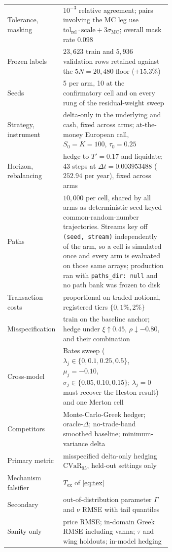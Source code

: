 \documentclass{article}
\begin{document}
\begin{table}[h]
\begin{tabular}{@{}lp{0.66\linewidth}@{}}
Tolerance, masking & $10^{-3}$ relative agreement; pairs involving the MC leg use $\mathrm{tol_{rel}}\cdot\mathrm{scale} + 3\sigma_{\mathrm{MC}}$; overall mask rate $0.098$ \\
Frozen labels & $23{,}623$ train and $5{,}936$ validation rows retained against the $5N = 20{,}480$ floor ($+15.3\%$) \\
Seeds & 5 per arm, 10 at the confirmatory cell and on every rung of the residual-weight sweep \\
\midrule
Strategy, instrument & delta-only in the underlying and cash, fixed across arms; at-the-money European call, $S_0{=}K{=}100$, $\tau_0{=}0.25$ \\
Horizon, rebalancing & hedge to $T'{=}0.17$ and liquidate; 43 steps at $\Delta t=0.003953488$ ($252.94$ per year), fixed across arms \\
Paths & $10{,}000$ per cell, shared by all arms as deterministic seed-keyed common-random-number trajectories. Streams key off \texttt{(seed, stream)} independently of the arm, so a cell is simulated once and every arm is evaluated on those same arrays; production ran with \texttt{paths\_dir: null} and no path bank was frozen to disk \\
Transaction costs & proportional on traded notional, registered tiers $\{0, 1\%, 2\%\}$ \\
Misspecification & train on the baseline anchor; hedge under $\xi{\uparrow}0.45$, $\rho{\downarrow}{-}0.80$, and their combination \\
Cross-model & Bates sweep ($\lambda_j\in\{0,0.1,0.25,0.5\}$, $\mu_j{=}-0.10$, $\sigma_j\in\{0.05,0.10,0.15\}$; $\lambda_j{=}0$ must recover the Heston result) and one Merton cell \\
Competitors & Monte-Carlo-Greek hedger; oracle-$\Delta$; no-trade-band smoothed baseline; minimum-variance delta \\
\midrule
Primary metric & misspecified delta-only hedging $\mathrm{CVaR}_{95}$, held-out settings only \\
Mechanism falsifier & $T_{\mathrm{ex}}$ of \eqref{eq:tex} \\
Secondary & out-of-distribution parameter $\Gamma$ and $\nu$ RMSE with tail quantiles \\
Sanity only & price RMSE; in-domain Greek RMSE including vanna; $\tau$ and wing holdouts; in-model hedging \\
\bottomrule
\end{tabular}
\end{table}
\end{document}
